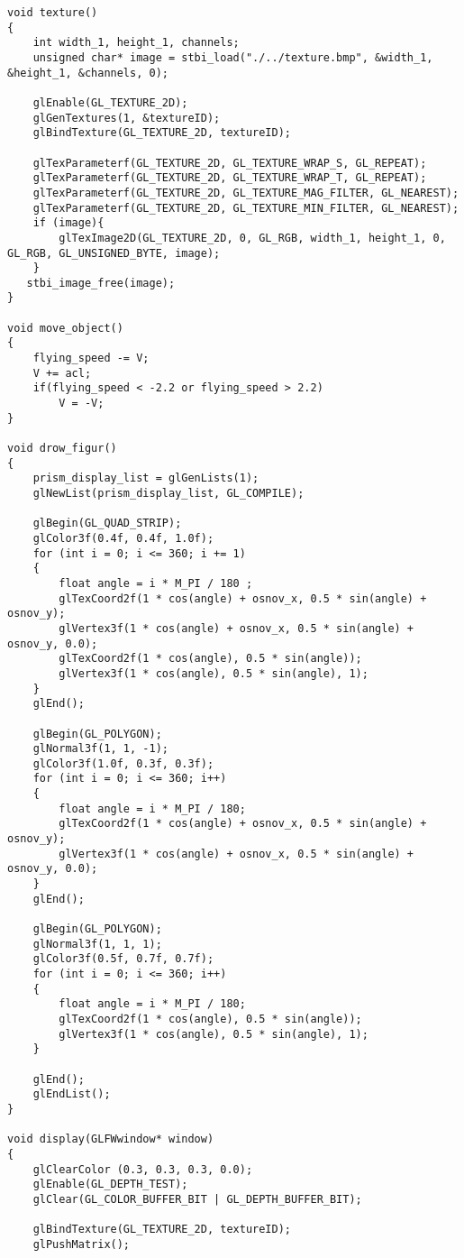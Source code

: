 \documentclass[a4paper, 14pt]{extarticle}
\begin{document}
\begin{verbatim}
void texture()
{
    int width_1, height_1, channels;
    unsigned char* image = stbi_load("./../texture.bmp", &width_1, &height_1, &channels, 0);
    
    glEnable(GL_TEXTURE_2D);
    glGenTextures(1, &textureID);
    glBindTexture(GL_TEXTURE_2D, textureID);

    glTexParameterf(GL_TEXTURE_2D, GL_TEXTURE_WRAP_S, GL_REPEAT);
    glTexParameterf(GL_TEXTURE_2D, GL_TEXTURE_WRAP_T, GL_REPEAT);
    glTexParameterf(GL_TEXTURE_2D, GL_TEXTURE_MAG_FILTER, GL_NEAREST);
    glTexParameterf(GL_TEXTURE_2D, GL_TEXTURE_MIN_FILTER, GL_NEAREST);
    if (image){
        glTexImage2D(GL_TEXTURE_2D, 0, GL_RGB, width_1, height_1, 0, GL_RGB, GL_UNSIGNED_BYTE, image);
    }
   stbi_image_free(image);
}

void move_object()
{
    flying_speed -= V;
    V += acl;
    if(flying_speed < -2.2 or flying_speed > 2.2)
        V = -V;
}

void drow_figur()
{
    prism_display_list = glGenLists(1);
    glNewList(prism_display_list, GL_COMPILE);

    glBegin(GL_QUAD_STRIP);
    glColor3f(0.4f, 0.4f, 1.0f);
    for (int i = 0; i <= 360; i += 1)
    {
        float angle = i * M_PI / 180 ;
        glTexCoord2f(1 * cos(angle) + osnov_x, 0.5 * sin(angle) + osnov_y);
        glVertex3f(1 * cos(angle) + osnov_x, 0.5 * sin(angle) + osnov_y, 0.0);
        glTexCoord2f(1 * cos(angle), 0.5 * sin(angle));
        glVertex3f(1 * cos(angle), 0.5 * sin(angle), 1);
    }
    glEnd();

    glBegin(GL_POLYGON);
    glNormal3f(1, 1, -1);
    glColor3f(1.0f, 0.3f, 0.3f);
    for (int i = 0; i <= 360; i++)
    {
        float angle = i * M_PI / 180;
        glTexCoord2f(1 * cos(angle) + osnov_x, 0.5 * sin(angle) + osnov_y);
        glVertex3f(1 * cos(angle) + osnov_x, 0.5 * sin(angle) + osnov_y, 0.0);
    }
    glEnd();

    glBegin(GL_POLYGON);
    glNormal3f(1, 1, 1);
    glColor3f(0.5f, 0.7f, 0.7f);
    for (int i = 0; i <= 360; i++)
    {
        float angle = i * M_PI / 180;
        glTexCoord2f(1 * cos(angle), 0.5 * sin(angle));
        glVertex3f(1 * cos(angle), 0.5 * sin(angle), 1);
    }
    
    glEnd();
    glEndList();
}

void display(GLFWwindow* window)
{
    glClearColor (0.3, 0.3, 0.3, 0.0);
    glEnable(GL_DEPTH_TEST);
    glClear(GL_COLOR_BUFFER_BIT | GL_DEPTH_BUFFER_BIT);

    glBindTexture(GL_TEXTURE_2D, textureID);
    glPushMatrix();


\end{verbatim}
\end{document}
